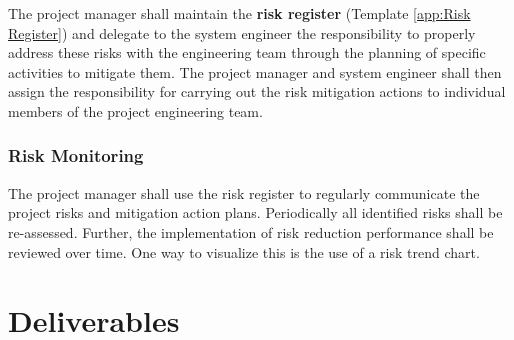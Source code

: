 The project manager shall maintain the \textbf{risk register} (Template \ref{app:Risk Register}) and delegate to the system engineer the responsibility to properly address these risks with the engineering team through the planning of specific activities to mitigate them. The project manager and system engineer shall then assign the responsibility for carrying out the risk mitigation actions to individual members of the project engineering team.
 
\subsubsection{Risk Monitoring}

The project manager shall use the risk register to regularly communicate the project risks and mitigation action plans. Periodically all identified risks shall be re-assessed. Further, the implementation of risk reduction performance shall be reviewed over time. One way to visualize this is the use of a risk trend chart. 
  
\clearpage
\section{Deliverables}

